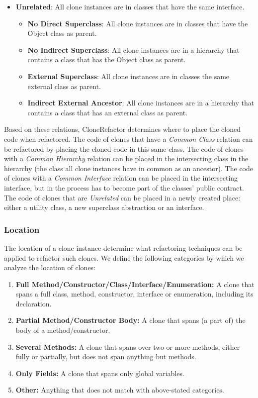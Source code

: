 \documentclass[sigconf,review, table]{acmart}
\begin{document}
\begin{itemize}
\begin{itemize}
    \end{itemize}
    \item \textbf{Unrelated}: All clone instances are in classes that have the same interface.
    \begin{itemize}
        \item \textbf{No Direct Superclass}: All clone instances are in classes that have the Object class as parent.
        \item \textbf{No Indirect Superclass}: All clone instances are in a hierarchy that contains a class that has the Object class as parent.
        \item \textbf{External Superclass}: All clone instances are in classes the same external class as parent.
        \item \textbf{Indirect External Ancestor}: All clone instances are in a hierarchy that contains a class that has an external class as parent.
    \end{itemize}
\end{itemize}

Based on these relations, CloneRefactor determines where to place the cloned code when refactored. The code of clones that have a \textit{Common Class} relation can be refactored by placing the cloned code in this same class. The code of clones with a \textit{Common Hierarchy} relation can be placed in the intersecting class in the hierarchy (the class all clone instances have in common as an ancestor). The code of clones with a \textit{Common Interface} relation can be placed in the intersecting interface, but in the process has to become part of the classes' public contract. The code of clones that are \textit{Unrelated} can be placed in a newly created place: either a utility class, a new superclass abstraction or an interface.

\subsubsection{Location}\label{sec:location}
The location of a clone instance determine what refactoring techniques can be applied to refactor such clones. We define the following categories by which we analyze the location of clones:
\begin{enumerate}
  \item \textbf{Full Method/Constructor/Class/Interface/Enumeration:} A clone that spans a full class, method, constructor, interface or enumeration, including its declaration.
  \item \textbf{Partial Method/Constructor Body:} A clone that spans (a part of) the body of a method/constructor.
  \item \textbf{Several Methods:} A clone that spans over two or more methods, either fully or partially, but does not span anything but methods.
  \item \textbf{Only Fields:} A clone that spans only global variables.
  \item \textbf{Other:} Anything that does not match with above-stated categories.
\end{enumerate}
\end{document}
